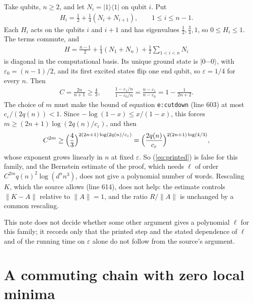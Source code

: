 \documentclass{article}
\begin{document}
Take qubits, $n\ge2$, and let $N_i=|1\rangle\langle1|$ on qubit $i$. Put
\begin{align*}
    H_i=\frac12+\frac14(N_i+N_{i+1}),\qquad 1\le i\le n-1.
\end{align*}
Each $H_i$ acts on the qubits $i$ and $i+1$ and has eigenvalues
$\tfrac12,\tfrac34,1$, so $0\le H_i\le1$. The terms commute, and
\begin{align*}
    H=\frac{n-1}2+\frac14(N_1+N_n)+\frac12\sum_{1<i<n}N_i
\end{align*}
is diagonal in the computational basis. Its unique ground state is
$|0\cdots0\rangle$, with $\varepsilon_0=(n-1)/2$, and its first excited states
flip one end qubit, so $\varepsilon=1/4$ for every $n$. Then
\begin{align*}
    C=\frac{2n}{n+1}\ge\frac43,
    \qquad
    \frac{1-\varepsilon_1/n}{1-\varepsilon_0/n}
    =\frac{n-\varepsilon_1}{n-\varepsilon_0}=1-\frac1{2n+2}.
\end{align*}
The choice of $m$ must make the bound of equation \texttt{e:cutdown} (line 603)
at most $c_\varepsilon/(2q(n))<1$. Since $-\log(1-x)\le x/(1-x)$, this forces
$m\ge(2n+1)\log(2q(n)/c_\varepsilon)$, and then
\begin{align*}
    C^{2m}\ge\Bigl(\frac43\Bigr)^{2(2n+1)\log(2q(n)/c_\varepsilon)}
    =\Bigl(\frac{2q(n)}{c_\varepsilon}\Bigr)^{2(2n+1)\log(4/3)},
\end{align*}
whose exponent grows linearly in $n$ at fixed $\varepsilon$. So
(\ref{eq:printed}) is false for this family, and the Bernstein estimate of the
proof, which needs $\ell$ of order $C^{2m}q(n)^2\log(d^n n^3)$, does not give a
polynomial number of words. Rescaling $K$, which the source allows (line 614),
does not help: the estimate controls $\|K-A\|$ relative to $\|A\|=1$, and the
ratio $R/\|A\|$ is unchanged by a common rescaling.

This note does not decide whether some other argument gives a polynomial $\ell$
for this family; it records only that the printed step and the stated
dependence of $\ell$ and of the running time on $\varepsilon$ alone do not
follow from the source's argument.

\section{A commuting chain with zero local minima}
\end{document}
